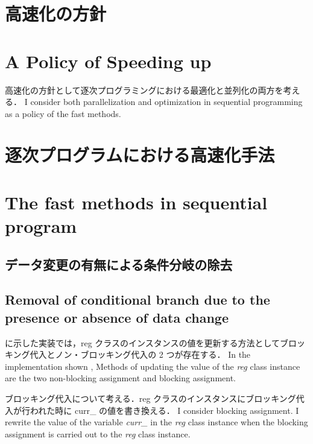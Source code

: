 \section{高速化の方針}
\fi
\section{A Policy of Speeding up}

高速化の方針として逐次プログラミングにおける最適化と並列化の両方を考える．
\fi
I consider both parallelization and optimization in sequential programming
as a policy of the fast methods.

\section{逐次プログラムにおける高速化手法}
\fi
\section{The fast methods in sequential program}

\subsection{データ変更の有無による条件分岐の除去 \label{sss:no_set}}
\fi

\subsection{Removal of conditional branch due to the presence or absence of data change}
\label{sss:no_set}

 に示した実装では，reg クラスのインスタンスの値を更新する方法としてブロッキング代入とノン・ブロッキング代入の 2 つが存在する．
\fi
In the implementation shown ,
Methods of updating the value of the \textit{reg} class instance are the two non-blocking assignment and blocking assignment.

ブロッキング代入について考える．reg クラスのインスタンスにブロッキング代入が行われた時に curr\_ の値を書き換える．
\fi
I consider blocking assignment.
I rewrite the value of the variable \textit{curr\_} in the \textit{reg} class instance
when the blocking assignment is carried out to the \textit{reg} class instance.

